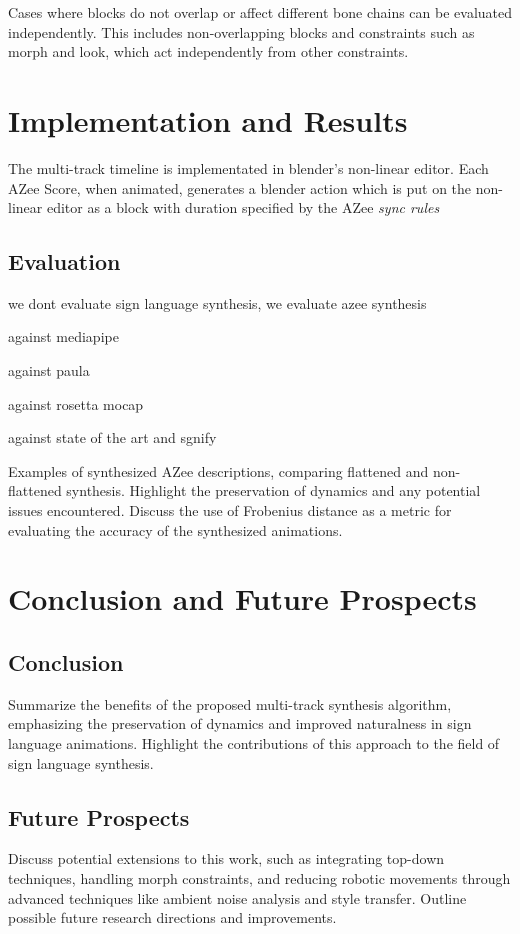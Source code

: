 \documentclass[../../main.tex]{subfiles}
\begin{document}
Cases where blocks do not overlap or affect different bone chains can be evaluated independently. This includes non-overlapping blocks and constraints such as morph and look, which act independently from other constraints.



\section{Implementation and Results}

The multi-track timeline is implementated in blender's non-linear editor. Each AZee Score, when animated, generates a blender action which is put on the non-linear editor as a block with duration specified by the AZee \emph{sync rules}

\subsection{Evaluation}

we dont evaluate sign language synthesis, we evaluate azee synthesis

against mediapipe 

against paula

against rosetta mocap

against state of the art and sgnify

Examples of synthesized AZee descriptions, comparing flattened and non-flattened synthesis. Highlight the preservation of dynamics and any potential issues encountered. Discuss the use of Frobenius distance as a metric for evaluating the accuracy of the synthesized animations.

\section{Conclusion and Future Prospects}

\subsection{Conclusion}
Summarize the benefits of the proposed multi-track synthesis algorithm, emphasizing the preservation of dynamics and improved naturalness in sign language animations. Highlight the contributions of this approach to the field of sign language synthesis.

\subsection{Future Prospects}
Discuss potential extensions to this work, such as integrating top-down techniques, handling morph constraints, and reducing robotic movements through advanced techniques like ambient noise analysis and style transfer. Outline possible future research directions and improvements.
\end{document}
